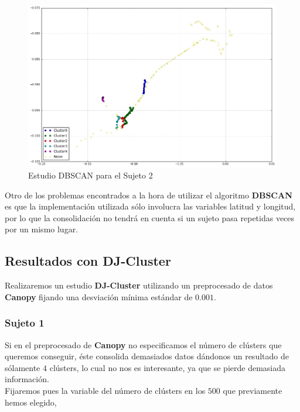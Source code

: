 \documentclass[a4paper, 12pt]{article}
\begin{document}
\begin{figure}[H]
	\includegraphics[scale=.7]{../comparativa/dbscanSujeto2.png}
	\caption{Estudio DBSCAN para el Sujeto 2}
\end{figure}

Otro de los problemas encontrados a la hora de utilizar el algoritmo \textbf{DBSCAN} es que la implementaci\'on utilizada s\'olo involucra las variables latitud y longitud, por lo que la consolidaci\'on no tendr\'a en cuenta si un sujeto pasa repetidas veces por un mismo lugar.\\

\subsection{Resultados con DJ-Cluster}

Realizaremos un estudio \textbf{DJ-Cluster} utilizando un preprocesado de datos \textbf{Canopy} fijando una desviaci\'on m\'inima est\'andar de $0.001$. \\

\subsubsection{Sujeto 1}

Si en el preprocesado de \textbf{Canopy} no especificamos el n\'umero de cl\'usters que queremos conseguir, \'este consolida demasiados datos d\'andonos un resultado de s\'olamente $4$ cl\'usters, lo cual no nos es interesante, ya que se pierde demasiada informaci\'on. \\

Fijaremos pues la variable del n\'umero de cl\'usters en los $500$ que previamente hemos elegido,\\
\end{document}
